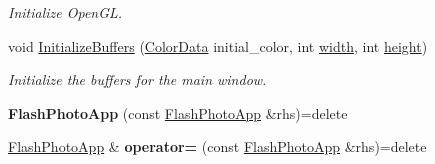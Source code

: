\begin{DoxyCompactItemize}
\begin{DoxyCompactList}\small\item\em Initialize Open\+GL. \end{DoxyCompactList}\item 
void \hyperlink{classimage__tools_1_1FlashPhotoApp_a08e318814d7f7fb1aa2c05a61711f672}{Initialize\+Buffers} (\hyperlink{classimage__tools_1_1ColorData}{Color\+Data} initial\+\_\+color, int \hyperlink{classimage__tools_1_1BaseGfxApp_a2fe403c5392f624477c2ce4429f1a7b5}{width}, int \hyperlink{classimage__tools_1_1BaseGfxApp_aa961e13a7a8e6062204223cc33ac7503}{height})\hypertarget{classimage__tools_1_1FlashPhotoApp_a08e318814d7f7fb1aa2c05a61711f672}{}\label{classimage__tools_1_1FlashPhotoApp_a08e318814d7f7fb1aa2c05a61711f672}

\begin{DoxyCompactList}\small\item\em Initialize the buffers for the main window. \end{DoxyCompactList}\item 
{\bfseries Flash\+Photo\+App} (const \hyperlink{classimage__tools_1_1FlashPhotoApp}{Flash\+Photo\+App} \&rhs)=delete\hypertarget{classimage__tools_1_1FlashPhotoApp_a3009fefcee5cd98e46e6b4dc3b3cf6be}{}\label{classimage__tools_1_1FlashPhotoApp_a3009fefcee5cd98e46e6b4dc3b3cf6be}

\item 
\hyperlink{classimage__tools_1_1FlashPhotoApp}{Flash\+Photo\+App} \& {\bfseries operator=} (const \hyperlink{classimage__tools_1_1FlashPhotoApp}{Flash\+Photo\+App} \&rhs)=delete\hypertarget{classimage__tools_1_1FlashPhotoApp_a9ecfbf7bd80d0ef20ba5cf6b61538699}{}\label{classimage__tools_1_1FlashPhotoApp_a9ecfbf7bd80d0ef20ba5cf6b61538699}

\end{DoxyCompactItemize}
